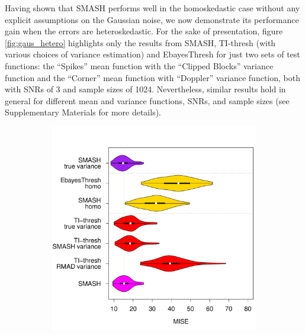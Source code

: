 \documentclass[12pt]{article}
\begin{document}
Having shown that SMASH performs well in the homoskedastic case without any explicit assumptions on the Gaussian noise, we now demonstrate its performance gain when the errors are heteroskedastic. For the sake of presentation, figure \ref{fig:gaus_hetero} highlights only the results from SMASH, TI-thresh (with various choices of variance estimation) and EbayesThresh for just two sets of test functions: the ``Spikes'' mean function with the ``Clipped Blocks'' variance function and the ``Corner'' mean function with ``Doppler'' variance function, both with SNRs of 3 and sample sizes of 1024. Nevertheless, similar results hold in general for different mean and variance functions, SNRs, and sample sizes (see Supplementary Materials for more details). 


\begin{figure}
\centering
    \begin{subfigure}[b]{0.65\textwidth}
        \centering
        \includegraphics[width=\textwidth]{violin_gaus_hetero_1.pdf}
        \caption{}
        \label{fig:gaus_hetero_1}
    \end{subfigure}
		\hfill
    \begin{subfigure}[b]{0.3\textwidth}
        \centering

\end{subfigure}
\end{figure}
\end{document}
